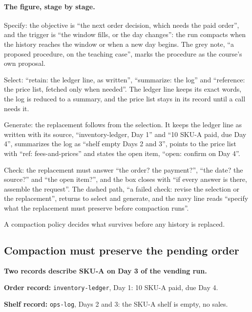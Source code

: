 \paragraph{The figure, stage by stage.}
\be
\item Specify: the objective is ``the next order decision, which needs the paid order'', and the trigger is ``the window fills, or the day changes'': the run compacts when the history reaches the window or when a new day begins. The grey note, ``a proposed procedure, on the teaching case'', marks the procedure as the course's own proposal.
\item Select: ``retain: the ledger line, as written'', ``summarize: the log'' and ``reference: the price list, fetched only when needed''. The ledger line keeps its exact words, the log is reduced to a summary, and the price list stays in its record until a call needs it.
\item Generate: the replacement follows from the selection. It keeps the ledger line as written with its source, ``inventory-ledger, Day 1'' and ``10 SKU-A paid, due Day 4'', summarizes the log as ``shelf empty Days 2 and 3'', points to the price list with ``ref: fees-and-prices'' and states the open item, ``open: confirm on Day 4''.
\item Check: the replacement must answer ``the order? the payment?'', ``the date? the source?'' and ``the open item?'', and the box closes with ``if every answer is there, assemble the request''. The dashed path, ``a failed check: revise the selection or the replacement'', returns to select and generate, and the navy line reads ``specify what the replacement must preserve before compaction runs''.
\ee

\begin{takeaway}A compaction policy decides what survives before any history is replaced.\end{takeaway}

\subsection{Compaction must preserve the pending order}
\label{sec:it-9-2}

\textbf{Two records describe SKU-A on Day 3 of the vending run.}

\bi
\item \textbf{Order record:} \texttt{inventory-ledger}, Day 1: 10 SKU-A paid, due Day 4.
\item \textbf{Shelf record:} \texttt{ops-log}, Days 2 and 3: the SKU-A shelf is empty, no sales.
\ei

